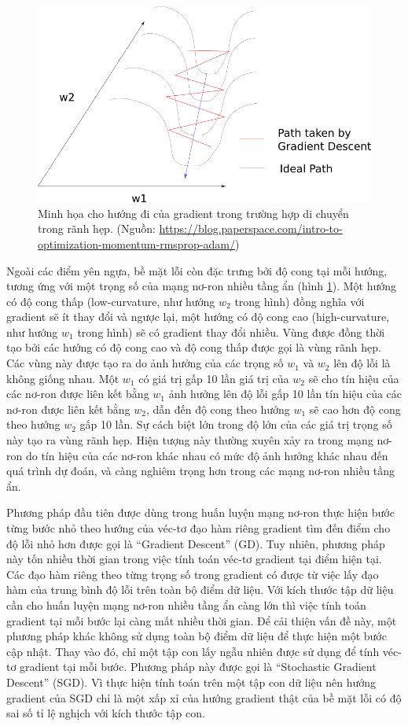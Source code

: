 \begin{figure}[htp]
	\centering
	\includegraphics[width=100 mm]{images/valley.png}
	\caption{Minh họa cho hướng đi của gradient trong trường hợp di chuyển trong rãnh hẹp. (Nguồn: \url{https://blog.paperspace.com/intro-to-optimization-momentum-rmsprop-adam/})}
	\label{fig:valley}
\end{figure}

Ngoài các điểm yên ngựa, bề mặt lỗi còn đặc trưng bởi độ cong tại mỗi hướng, tương ứng với một trọng số của mạng nơ-ron nhiều tầng ẩn (hình \ref{fig:valley}). Một hướng có độ cong thấp (low-curvature, như hướng $w_2$ trong hình) đồng nghĩa với gradient sẽ ít thay đổi và ngược lại, một hướng có độ cong cao (high-curvature, như hướng $w_1$ trong hình) sẽ có gradient thay đổi nhiều. Vùng được đồng thời tạo bởi các hướng có độ cong cao và độ cong thấp được gọi là vùng rãnh hẹp. Các vùng này được tạo ra do ảnh hưởng của các trọng số $w_1$ và $w_2$ lên độ lỗi là không giống nhau. Một $w_1$ có giá trị gấp 10 lần giá trị của $w_2$ sẽ cho tín hiệu của các nơ-ron được liên kết bằng $w_1$ ảnh hưởng lên độ lỗi gấp 10 lần tín hiệu của các nơ-ron được liên kết bằng $w_2$, dẫn đến độ cong theo hướng $w_1$ sẽ cao hơn độ cong theo hướng $w_2$ gấp 10 lần. Sự cách biệt lớn trong độ lớn của các giá trị trọng số này tạo ra vùng rãnh hẹp. Hiện tượng này thường xuyên xảy ra trong mạng nơ-ron do tín hiệu của các nơ-ron khác nhau có mức độ ảnh hưởng khác nhau đến quá trình dự đoán, và càng nghiêm trọng hơn trong các mạng nơ-ron nhiều tầng ẩn.

Phương pháp đầu tiên được dùng trong huấn luyện mạng nơ-ron thực hiện bước từng bước nhỏ theo hướng của véc-tơ đạo hàm riêng gradient tìm đến điểm cho độ lỗi nhỏ hơn được gọi là ``Gradient Descent'' (GD). Tuy nhiên, phương pháp này tốn nhiều thời gian trong việc tính toán véc-tơ gradient tại điểm hiện tại. Các đạo hàm riêng theo từng trọng số trong gradient có được từ việc lấy đạo hàm của trung bình độ lỗi trên toàn bộ điểm dữ liệu. Với kích thước tập dữ liệu cần cho huấn luyện mạng nơ-ron nhiều tầng ẩn càng lớn thì việc tính toán gradient tại mỗi bước lại càng mất nhiều thời gian. Để cải thiện vấn đề này, một phương pháp khác không sử dụng toàn bộ điểm dữ liệu để thực hiện một bước cập nhật. Thay vào đó, chỉ một tập con lấy ngẫu nhiên được sử dụng để tính véc-tơ gradient tại mỗi bước. Phương pháp này được gọi là ``Stochastic Gradient Descent'' (SGD). Vì thực hiện tính toán trên một tập con dữ liệu nên hướng gradient của SGD chỉ là một xấp xỉ của hướng gradient thật của bề mặt lỗi có độ sai số tỉ lệ nghịch với kích thước tập con.

